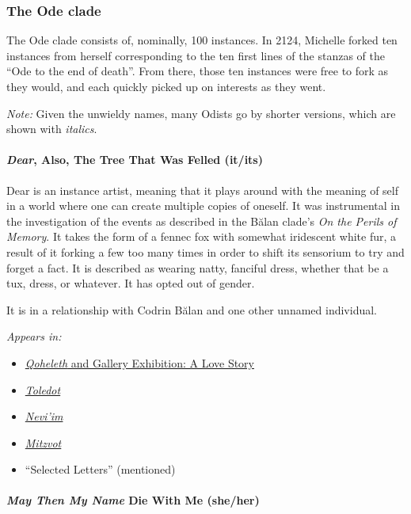 \subsubsection{The Ode clade}

The Ode clade consists of, nominally, 100 instances. In 2124, Michelle forked ten instances from herself corresponding to the ten first lines of the stanzas of the ``Ode to the end of death''. From there, those ten instances were free to fork as they would, and each quickly picked up on interests as they went.

\emph{Note:} Given the unwieldy names, many Odists go by shorter versions, which are shown with \emph{italics}.

\paragraph{\texorpdfstring{\emph{Dear}, Also, The Tree That Was Felled (it/its)}{Dear, Also, The Tree That Was Felled (it/its)}}

Dear is an instance artist, meaning that it plays around with the meaning of self in a world where one can create multiple copies of oneself. It was instrumental in the investigation of the events as described in the Bălan clade's \emph{On the Perils of Memory}. It takes the form of a fennec fox with somewhat iridescent white fur, a result of it forking a few too many times in order to shift its sensorium to try and forget a fact. It is described as wearing natty, fanciful dress, whether that be a tux, dress, or whatever. It has opted out of gender.

It is in a relationship with Codrin Bălan and one other unnamed individual.


\emph{Appears in:}

\begin{itemize}
\tightlist
\item
  \href{https://qoheleth.post-self.ink}{\emph{Qoheleth} and Gallery Exhibition: A Love Story}
\item
  \href{https://toledot.post-self.ink}{\emph{Toledot}}
\item
  \href{https://neviim.post-self.ink}{\emph{Nevi'im}}
\item
  \href{https://mitzvot.post-self.ink}{\emph{Mitzvot}}
\item
  ``Selected Letters'' (mentioned)
\end{itemize}

\paragraph{\texorpdfstring{\emph{May Then My Name} Die With Me (she/her)}{May Then My Name Die With Me (she/her)}}

